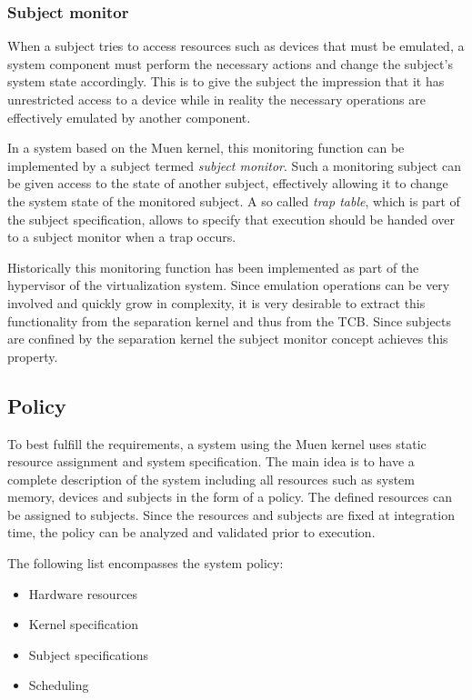 \subsubsection{Subject monitor}
When a subject tries to access resources such as devices that must be emulated,
a system component must perform the necessary actions and change the subject's
system state accordingly. This is to give the subject the impression that it
has unrestricted access to a device while in reality the necessary operations
are effectively emulated by another component.

In a system based on the Muen kernel, this monitoring function can be
implemented by a subject termed \emph{subject monitor}. Such a monitoring
subject can be given access to the state of another subject, effectively
allowing it to change the system state of the monitored subject. A so called
\emph{trap table}, which is part of the subject specification, allows to
specify that execution should be handed over to a subject monitor when a trap
occurs.

Historically this monitoring function has been implemented as part of the
hypervisor of the virtualization system. Since emulation operations can be very
involved and quickly grow in complexity, it is very desirable to extract this
functionality from the separation kernel and thus from the TCB. Since subjects
are confined by the separation kernel the subject monitor concept achieves this
property.

\subsection{Policy}\label{subsec:policy}
To best fulfill the requirements, a system using the Muen kernel uses static
resource assignment and system specification. The main idea is to have a
complete description of the system including all resources such as system
memory, devices and subjects in the form of a policy. The defined resources can
be assigned to subjects. Since the resources and subjects are fixed at
integration time, the policy can be analyzed and validated prior to execution.

The following list encompasses the system policy:
\begin{itemize}
	\item Hardware resources
	\item Kernel specification
	\item Subject specifications
	\item Scheduling
\end{itemize}


